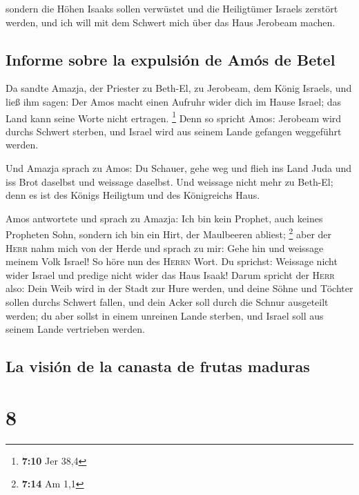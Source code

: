  sondern die Höhen Isaaks sollen verwüstet und die
Heiligtümer Israels zerstört werden, und ich will mit dem Schwert mich
über das Haus Jerobeam machen.

\hypertarget{informe-sobre-la-expulsiuxf3n-de-amuxf3s-de-betel}{%
\subsection{Informe sobre la expulsión de Amós de
Betel}\label{informe-sobre-la-expulsiuxf3n-de-amuxf3s-de-betel}}

 Da sandte Amazja, der Priester zu Beth-El, zu Jerobeam,
dem König Israels, und ließ ihm sagen: Der Amos macht einen Aufruhr
wider dich im Hause Israel; das Land kann seine Worte nicht ertragen.
\footnote{\textbf{7:10} Jer 38,4}  Denn so spricht Amos:
Jerobeam wird durchs Schwert sterben, und Israel wird aus seinem Lande
gefangen weggeführt werden.

 Und Amazja sprach zu Amos: Du Schauer, gehe weg und
flieh ins Land Juda und iss Brot daselbst und weissage daselbst.
 Und weissage nicht mehr zu Beth-El; denn es ist des
Königs Heiligtum und des Königreichs Haus.

 Amos antwortete und sprach zu Amazja: Ich bin kein
Prophet, auch keines Propheten Sohn, sondern ich bin ein Hirt, der
Maulbeeren abliest; \footnote{\textbf{7:14} Am 1,1}  aber
der \textsc{Herr} nahm mich von der Herde und sprach zu mir: Gehe hin
und weissage meinem Volk Israel!  So höre nun des
\textsc{Herrn} Wort. Du sprichst: Weissage nicht wider Israel und
predige nicht wider das Haus Isaak!  Darum spricht der
\textsc{Herr} also: Dein Weib wird in der Stadt zur Hure werden, und
deine Söhne und Töchter sollen durchs Schwert fallen, und dein Acker
soll durch die Schnur ausgeteilt werden; du aber sollst in einem
unreinen Lande sterben, und Israel soll aus seinem Lande vertrieben
werden.

\hypertarget{la-visiuxf3n-de-la-canasta-de-frutas-maduras}{%
\subsection{La visión de la canasta de frutas
maduras}\label{la-visiuxf3n-de-la-canasta-de-frutas-maduras}}

\hypertarget{section-7}{%
\section{8}\label{section-7}}

